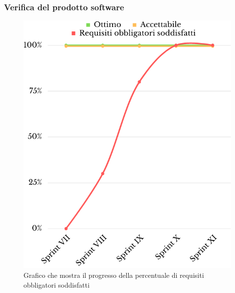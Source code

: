 \subsubsection{Verifica del prodotto software}
\begin{figure}[H]
	\centering
	\includegraphics[scale=0.5]{img/copertura_funzionale.png}
	\caption{Grafico che mostra il progresso della percentuale di requisiti obbligatori soddisfatti}
\end{figure}
